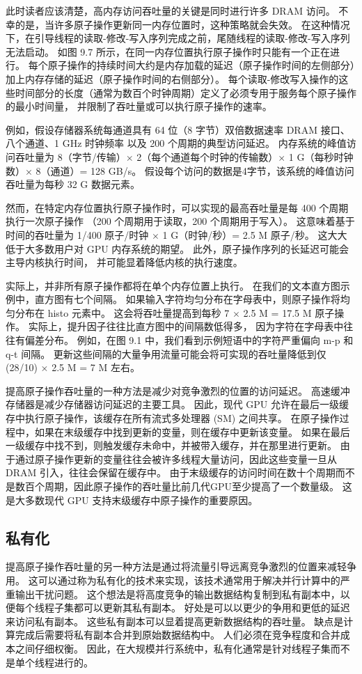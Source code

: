 此时读者应该清楚，高内存访问吞吐量的关键是同时进行许多 DRAM 访问。 
不幸的是，当许多原子操作更新同一内存位置时，这种策略就会失效。 
在这种情况下，在引导线程的读取-修改-写入序列完成之前，尾随线程的读取-修改-写入序列无法启动。 
如图 9.7 所示，在同一内存位置执行原子操作时只能有一个正在进行。 
每个原子操作的持续时间大约是内存加载的延迟（原子操作时间的左侧部分）加上内存存储的延迟（原子操作时间的右侧部分）。 
每个读取-修改写入操作的这些时间部分的长度（通常为数百个时钟周期）定义了必须专用于服务每个原子操作的最小时间量，
并限制了吞吐量或可以执行原子操作的速率。

例如，假设存储器系统每通道具有 64 位（8 字节）双倍数据速率 DRAM 接口、八个通道、1 GHz 时钟频率
以及 200 个周期的典型访问延迟。 
内存系统的峰值访问吞吐量为 8（字节/传输）$\times$ 2（每个通道每个时钟的传输数）$\times$ 1 G（每秒时钟数）$\times$ 8（通道）= 128 GB/s。 
假设每个访问的数据是4字节，该系统的峰值访问吞吐量为每秒 32 G 数据元素。

然而，在特定内存位置执行原子操作时，可以实现的最高吞吐量是每 400 个周期执行一次原子操作
（200 个周期用于读取，200 个周期用于写入）。 
这意味着基于时间的吞吐量为 1/400 原子/时钟 $\times$ 1 G（时钟/秒）= 2.5 M 原子/秒。 
这大大低于大多数用户对 GPU 内存系统的期望。 此外，原子操作序列的长延迟可能会主导内核执行时间，
并可能显着降低内核的执行速度。

实际上，并非所有原子操作都将在单个内存位置上执行。 在我们的文本直方图示例中，直方图有七个间隔。 
如果输入字符均匀分布在字母表中，则原子操作将均匀分布在 histo 元素中。 
这会将吞吐量提高到每秒 7 $\times$ 2.5 M = 17.5 M 原子操作。 实际上，提升因子往往比直方图中的间隔数低得多，
因为字符在字母表中往往有偏差分布。 例如，在图 9.1 中，我们看到示例短语中的字符严重偏向 m-p 和 q-t 间隔。 
更新这些间隔的大量争用流量可能会将可实现的吞吐量降低到仅 (28/10) $\times$ 2.5 M = 7 M 左右。

提高原子操作吞吐量的一种方法是减少对竞争激烈的位置的访问延迟。 高速缓冲存储器是减少存储器访问延迟的主要工具。 
因此，现代 GPU 允许在最后一级缓存中执行原子操作，该缓存在所有流式多处理器 (SM) 之间共享。 
在原子操作过程中，如果在末级缓存中找到更新的变量，则在缓存中更新该变量。 
如果在最后一级缓存中找不到，则触发缓存未命中，并被带入缓存，并在那里进行更新。 
由于通过原子操作更新的变量往往会被许多线程大量访问，因此这些变量一旦从 DRAM 引入，往往会保留在缓存中。 
由于末级缓存的访问时间在数十个周期而不是数百个周期，因此原子操作的吞吐量比前几代GPU至少提高了一个数量级。 
这是大多数现代 GPU 支持末级缓存中原子操作的重要原因。

\subsection{私有化}
提高原子操作吞吐量的另一种方法是通过将流量引导远离竞争激烈的位置来减轻争用。 
这可以通过称为私有化的技术来实现，该技术通常用于解决并行计算中的严重输出干扰问题。 
这个想法是将高度竞争的输出数据结构复制到私有副本中，以便每个线程子集都可以更新其私有副本。 
好处是可以以更少的争用和更低的延迟来访问私有副本。 这些私有副本可以显着提高更新数据结构的吞吐量。 
缺点是计算完成后需要将私有副本合并到原始数据结构中。 人们必须在竞争程度和合并成本之间仔细权衡。 
因此，在大规模并行系统中，私有化通常是针对线程子集而不是单个线程进行的。

